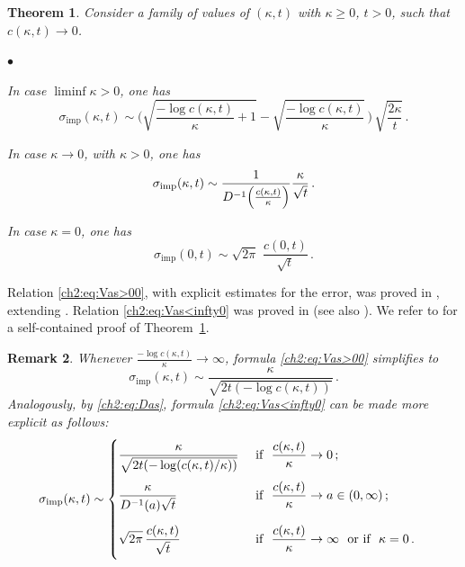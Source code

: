 \documentclass[a4paper,reqno,11pt]{amsart}
\numberwithin{equation}{section}
\newtheorem{theorem}{Theorem}[section]
\newtheorem{remark}[theorem]{Remark}
\newenvironment{myitemize}{%
\begin{list}{$\bullet$}%
 	{%
	\setlength{\itemsep}{0.4em}%
	\setlength{\topsep}{0.5em}%
	\setlength\leftmargin{2.45em}%
	\setlength\labelwidth{2.05em}%
	\setlength{\labelsep}{0.4em}%
	}%
	}%
{\end{list}}
\renewenvironment{itemize}{
\begin{myitemize}}%
{\end{myitemize}}
\newcommand\imp{\mathrm{imp}}
\begin{document}
\begin{theorem}\label{ch2:th:main1}
Consider a family of values of $(\kappa,t)$ with $\kappa\ge 0$, $t>0$,
such that $c(\kappa, t) \to 0$.
\begin{itemize}
\item In case $\liminf\kappa > 0$, one has
\begin{equation} \label{ch2:eq:Vas>00}
	\sigma_\imp(\kappa,t)  \sim
	\bigg( \sqrt{\frac{-\log c(\kappa,t)}{\kappa}+1} 
	-\sqrt{\frac{-\log c(\kappa,t)}{\kappa}} \, \bigg) \,
	\sqrt{\frac{2\kappa}{t}} \,.
\end{equation}
\item In case $\kappa\to 0$, with  $\kappa>0$, one has
\begin{equation} \label{ch2:eq:Vas<infty0}
	\sigma_\imp(\kappa,t)  \sim
	\frac{1}{\rule{0pt}{1.2em}D^{-1} 
	\Big(\frac{c(\kappa,t)}{\kappa} \Big)}
	\frac{\kappa}{\sqrt{t}} \,.
\end{equation}

\item In case $\kappa = 0$, one has
\begin{equation}\label{ch2:eq:Vas00}
	\sigma_\imp(0,t) \sim \sqrt{2\pi} \,\, \frac{c(0,t)}{\sqrt{t}}\,.
\end{equation}
\end{itemize}
\end{theorem}

Relation \eqref{ch2:eq:Vas>00}, with explicit estimates for the error,
was proved in \cite{cf:GL}, extending \cite{cf:BF,cf:L,cf:RR,cf:G}.
Relation \eqref{ch2:eq:Vas<infty0} was proved 
in \cite{cf:CC} (see also \cite{cf:MT}).
We refer to \cite[Theorem 2.9]{cf:CC} for 
a self-contained proof of Theorem~\ref{ch2:th:main1}.

\begin{remark}\rm\label{ch2:rem:simple}
Whenever $\frac{-\log c(\kappa,t)}{\kappa} \to \infty$, 
formula \eqref{ch2:eq:Vas>00} simplifies to
\begin{equation}\label{ch2:eq:Vas>00simple}
	\sigma_\imp(\kappa,t) \sim \frac{\kappa}
	{\sqrt{2t (-\log  c(\kappa,t) )}} \,.
\end{equation}
Analogously, by \eqref{ch2:eq:Das},  formula \eqref{ch2:eq:Vas<infty0}
can be made more explicit as follows:
\begin{align}\label{ch2:eq:Vas<infty0simple}
	& \sigma_\imp(\kappa,t) \sim \begin{cases}
	\rule{0em}{1.6em}\displaystyle
	\frac{\kappa}
	{\sqrt{2t ( - \log ( c(\kappa,t) / \kappa ) )}} & 
	\text{ if \ 
		$\displaystyle\frac{c(\kappa,t)}{\kappa} \to 0$} \,; \\
	\rule[-1.4em]{0em}{3.5em}\displaystyle
	\frac{\kappa}
	{D^{-1}(a) \sqrt{t}}  & 
	\text{ if \ 
	$\displaystyle\frac{c(\kappa,t)}{\kappa} \to a \in (0,\infty)$} \,; \\
	\rule[-1.4em]{0em}{3.5em}\displaystyle
	\sqrt{2\pi} \, \frac{c(\kappa,t)}{\sqrt{t}}  & 
	\text{ if \ 
	$\displaystyle\frac{c(\kappa,t)}{\kappa} \to \infty$ \ or
	if \ $\kappa = 0$} \,.
	\end{cases}
\end{align}
\end{remark}
\end{document}
